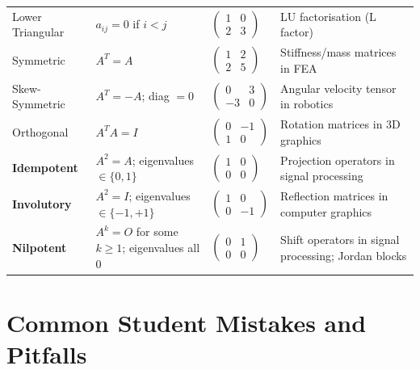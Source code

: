 \documentclass[12pt,a4paper]{article}
\begin{document}
\begin{center}
\begin{tabular}{@{}p{2.8cm}p{4.2cm}p{3cm}p{4cm}@{}}
\addlinespace
Lower Triangular & $a_{ij}=0$ if $i < j$ & $\begin{pmatrix}1&0\\2&3\end{pmatrix}$ & LU factorisation (L factor) \\
\addlinespace
Symmetric & $A^T = A$ & $\begin{pmatrix}1&2\\2&5\end{pmatrix}$ & Stiffness/mass matrices in FEA \\
\addlinespace
Skew-Symmetric & $A^T = -A$; diag $= 0$ & $\begin{pmatrix}0&3\\-3&0\end{pmatrix}$ & Angular velocity tensor in robotics \\
\addlinespace
Orthogonal & $A^T A = I$ & $\begin{pmatrix}0&-1\\1&0\end{pmatrix}$ & Rotation matrices in 3D graphics \\
\addlinespace
\textbf{Idempotent} & $A^2 = A$; eigenvalues $\in\{0,1\}$ & $\begin{pmatrix}1&0\\0&0\end{pmatrix}$ & Projection operators in signal processing \\
\addlinespace
\textbf{Involutory} & $A^2 = I$; eigenvalues $\in\{-1,+1\}$ & $\begin{pmatrix}1&0\\0&-1\end{pmatrix}$ & Reflection matrices in computer graphics \\
\addlinespace
\textbf{Nilpotent} & $A^k = O$ for some $k \geq 1$; eigenvalues all $0$ & $\begin{pmatrix}0&1\\0&0\end{pmatrix}$ & Shift operators in signal processing; Jordan blocks \\
\bottomrule
\end{tabular}
\end{center}

\section{Common Student Mistakes and Pitfalls}
\end{document}
